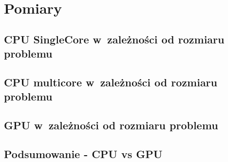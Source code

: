 \section{Pomiary}

\subsection{CPU SingleCore w~zależności od rozmiaru problemu}


\subsection{CPU multicore w~zależności od rozmiaru problemu}


\subsection{GPU w~zależności od rozmiaru problemu}



\subsection{Podsumowanie - CPU vs GPU}
